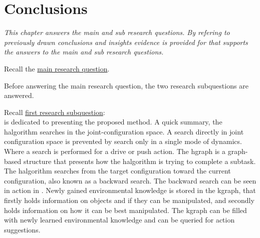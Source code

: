\chapter{Conclusions}%
\label{chap:conclusion}
\textit{This chapter answers the main and sub research questions. By refering to previously drawn conclusions and insights evidence is provided for that supports the answers to the main and sub research questions.\bs}

Recall the \hyperref[researchquestion:main]{main research question}. \vspace{0.5\baselineskip}\\
\textit{\indent{}}\vspace{\baselineskip}

\noindent Before answering the main research question, the two research subquestions are answered.\vspace{\baselineskip}

\noindent Recall \hyperref[researchsubquestion:does_it_work]{first research subquestion}:\vspace{0.5\baselineskip}\\
\textit{\indent{}\vspace{0.5\baselineskip}}
 is dedicated to presenting the proposed method. A quick summary, the \ac{halgorithm} searches in the joint-configuration space. A search directly in joint configuration space is prevented by search only in a single mode of dynamics. Where a search is performed for a drive or push action. The \ac{hgraph} is a graph-based structure that presents how the \ac{halgorithm} is trying to complete a subtask. The \ac{halgorithm} searches from the target configuration toward the current configuration, also known as a backward search. The backward search can be seen in action in . Newly gained environmental knowledge is stored in the \ac{kgraph}, that firstly holds information on objects and if they can be manipulated, and secondly holds information on how it can be best manipulated. The \ac{kgraph} can be filled with newly learned environmental knowledge and can be queried for action suggestions.\bs


